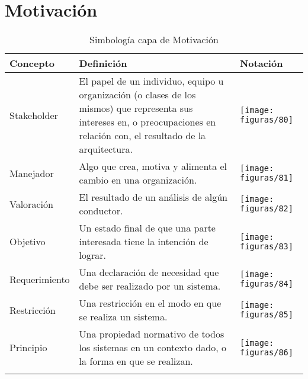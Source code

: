 \section{Motivación}
  \begin{longtable}
  	{m{3cm}m{4.8cm}m{5.2cm}}
  	\hline
  	\rowcolor[HTML]{0073a1}
  	{\color[HTML]{FFFFFF} \textbf{Concepto}} & {\color[HTML]{FFFFFF} \textbf{Definición}} & {\color[HTML]{FFFFFF} \textbf{Notación}} \\
  	\hline
  	Stakeholder & El papel de un individuo, equipo u organización (o clases de los mismos) que representa sus intereses en, o preocupaciones en relación con, el resultado de la arquitectura. & \texttt{[image: figuras/80]} \\ \hline
  	Manejador & Algo que crea, motiva y alimenta el cambio en una organización. & \texttt{[image: figuras/81]} \\ \hline
  	Valoración & El resultado de un análisis de algún conductor. & \texttt{[image: figuras/82]} \\ \hline
  	Objetivo & Un estado final de que una parte interesada tiene la intención de lograr. & \texttt{[image: figuras/83]} \\ \hline
  	Requerimiento & Una declaración de necesidad que debe ser realizado por un sistema. & \texttt{[image: figuras/84]} \\ \hline
  	Restricción & Una restricción en el modo en que se realiza un sistema. & \texttt{[image: figuras/85]} \\ \hline
  	Principio & Una propiedad normativo de todos los sistemas en un contexto dado, o la forma en que se realizan. & \texttt{[image: figuras/86]} \\
	\bottomrule
	\captionsetup{width=.95\textwidth}
	\caption{Simbología capa de Motivación}
	\label{tabla35}
  \end{longtable}

\newpage
